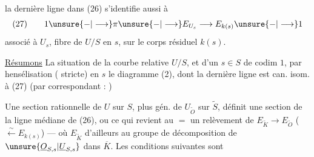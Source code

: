 la dernière ligne dans (26) s'identifie aussi à
\[
(27)\qquad 1\unsure{-|\longrightarrow}\pi\unsure{-|\longrightarrow}E_{U_s}\longrightarrow E_{k(s)}\unsure{-|\longrightarrow}1
\]
associé à $U_s$, fibre de $U/S$ en $s$, sur le corps résiduel $k(s)$.

\uline{Résumons} La situation de la courbe relative $U/S$, et d'un $s\in S$ de codim $1$,  par hensélisation ( stricte) en $s$ le diagramme (2), dont la dernière ligne est can. isom. à (27) (par   correspondant :
)

Une section rationnelle  de $U$ sur $S$, plus gén.  de $U_{\widetilde O}$ sur $\widetilde S$, définit une section  de la ligne médiane de (26), ou ce qui revient au $=$ un relèvement
de $E_{\widetilde K}\longrightarrow E_{\widetilde O}$ ($\xleftarrow{\sim}E_{k(s)}$) --- où $E_{\widetilde K}$  d'ailleurs  au groupe de décomposition de $\unsure{\underline O_{S,s}|\underline U_{S,s}}$ dans $\overline K$. Les conditions suivantes sont

